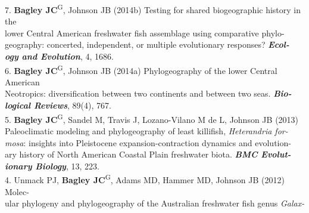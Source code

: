 \documentclass[margin,line]{res}
\begin{document}
\begin{resume}
7. \textbf{Bagley JC}\textsuperscript{G}, Johnson JB (2014b) Testing for shared biogeographic history in the\\
\hspace*{8mm} lower Central American freshwater fish assemblage using comparative phylo-\\
\hspace*{8mm} geography: concerted, independent, or multiple evolutionary responses? {\it \textbf{Ecol-}\\ \vspace{2mm}
\hspace*{8mm}\textbf{ogy and Evolution}}, 4, 1686. \\
6. \textbf{Bagley JC}\textsuperscript{G}, Johnson JB (2014a) Phylogeography of the lower Central American\\
\hspace*{8mm} Neotropics: diversification between two continents and between two seas. {\it \textbf{Bio-}\\ \vspace{2mm}
\hspace*{8mm}\textbf{logical Reviews}}, 89(4), 767. \\
5. \textbf{Bagley JC}\textsuperscript{G}, Sandel M, Travis J, Lozano-Vilano M de L, Johnson JB (2013)\\
\hspace*{8mm} Paleoclimatic modeling and phylogeography of least killifish, \emph{Heterandria for-}\\
\hspace*{8mm} \emph{mosa}: insights into Pleistocene expansion-contraction dynamics and evolution-\\
\hspace*{8mm} ary history of North American Coastal Plain freshwater biota. {\it \textbf{BMC Evolut-}\\ \vspace{2mm}
\hspace*{8mm}\textbf{ionary Biology}}, 13, 223. \\
4. Unmack PJ, \textbf{Bagley JC}\textsuperscript{G}, Adams MD, Hammer MD, Johnson JB (2012) Molec-\\
\hspace*{8mm} ular phylogeny and phylogeography of the Australian freshwater fish genus \emph{Galax-}\\

\end{resume}
\end{document}
